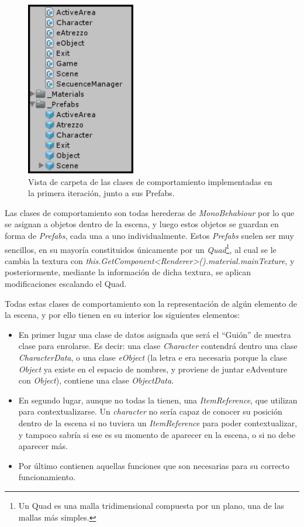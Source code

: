 \begin{figure}[htb]
	\includegraphics[height=3in]{figures/it1/behaviourclasses.png}
	\caption[Clases de Comportamiento - Prototipo 1]{Vista de carpeta de las clases de comportamiento implementadas en la primera iteración, junto a sus Prefabs.}
	\label{behaviourclassesit1}
\end{figure}

Las clases de comportamiento son todas herederas de \textit{MonoBehabiour} por lo que se asignan a objetos dentro de la escena, y luego estos objetos se guardan en forma de \textit{Prefabs}, cada una a uno individualmente. Estos \textit{Prefabs} suelen ser muy sencillos, en su mayoría constituidos únicamente por un \textit{Quad}\footnote{Un Quad es una malla tridimensional compuesta por un plano, una de las mallas más simples.}, al cual se le cambia la textura con \textit{this.GetComponent<Renderer>().material.mainTexture}, y posteriormente, mediante la información de dicha textura, se aplican modificaciones escalando el Quad. 

Todas estas clases de comportamiento son la representación de algún elemento de la escena, y por ello tienen en su interior los siguientes elementos:

\begin{itemize}
	\item En primer lugar una clase de datos asignada que será el “Guión” de nuestra clase para enrolarse. Es decir: una clase \textit{Character} contendrá dentro una clase \textit{CharacterData}, o una clase \textit{eObject} (la letra e era necesaria porque la clase \textit{Object} ya existe en el espacio de nombres, y proviene de juntar eAdventure con \textit{Object}), contiene una clase \textit{ObjectData}.
	
	\item En segundo lugar, aunque no todas la tienen, una \textit{ItemReference}, que utilizan para contextualizarse. Un \textit{character} no sería capaz de conocer su posición dentro de la escena si no tuviera un \textit{ItemReference} para poder contextualizar, y tampoco sabría si ese es su momento de aparecer en la escena, o si no debe aparecer más.
	
	\item Por último contienen aquellas funciones que son necesarias para su correcto funcionamiento.
\end{itemize}

